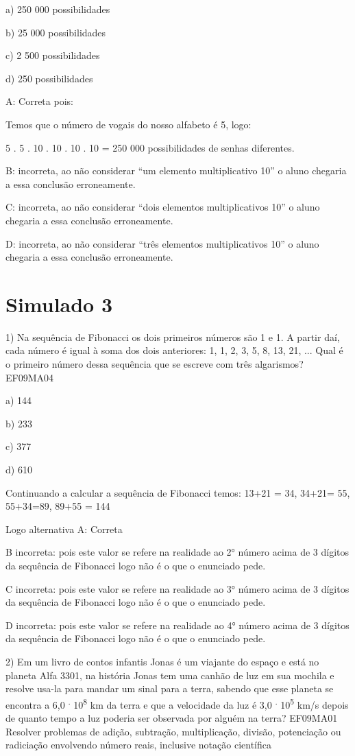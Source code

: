 a) 250 000 possibilidades

b) 25 000 possibilidades

c) 2 500 possibilidades

d) 250 possibilidades

A: Correta pois:

Temos que o número de vogais do nosso alfabeto é 5, logo:

5 . 5 . 10 . 10 . 10 . 10 = 250 000 possibilidades de senhas diferentes.

B: incorreta, ao não considerar ``um elemento multiplicativo 10'' o
aluno chegaria a essa conclusão erroneamente.

C: incorreta, ao não considerar ``dois elementos multiplicativos 10'' o
aluno chegaria a essa conclusão erroneamente.

D: incorreta, ao não considerar ``três elementos multiplicativos 10'' o
aluno chegaria a essa conclusão erroneamente.

\hypertarget{simulado-3}{%
\section{Simulado 3}\label{simulado-3}}

1) Na sequência de Fibonacci os dois primeiros números são 1 e 1. A
partir daí, cada número é igual à soma dos dois anteriores: 1, 1, 2, 3,
5, 8, 13, 21, ... Qual é o primeiro número dessa sequência que se
escreve com três algarismos? EF09MA04

a) 144

b) 233

c) 377

d) 610

Continuando a calcular a sequência de Fibonacci temos: 13+21 = 34,
34+21= 55, 55+34=89, 89+55 = 144

Logo alternativa A: Correta

B incorreta: pois este valor se refere na realidade ao 2° número acima
de 3 dígitos da sequência de Fibonacci logo não é o que o enunciado
pede.

C incorreta: pois este valor se refere na realidade ao 3° número acima
de 3 dígitos da sequência de Fibonacci logo não é o que o enunciado
pede.

D incorreta: pois este valor se refere na realidade ao 4° número acima
de 3 dígitos da sequência de Fibonacci logo não é o que o enunciado
pede.

2) Em um livro de contos infantis Jonas é um viajante do espaço e está
no planeta Alfa 3301, na história Jonas tem uma canhão de luz em sua
mochila e resolve usa-la para mandar um sinal para a terra, sabendo que
esse planeta se encontra a 6,0 \textsuperscript{.} 10\textsuperscript{8}
km da terra e que a velocidade da luz é 3,0 \textsuperscript{.}
10\textsuperscript{5} km/s depois de quanto tempo a luz poderia ser
observada por alguém na terra? EF09MA01 Resolver problemas de adição,
subtração, multiplicação, divisão, potenciação ou radiciação envolvendo
número reais, inclusive notação científica

